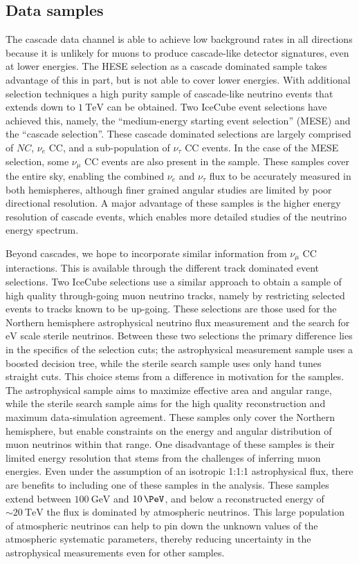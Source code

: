 \subsection{Data samples}
The cascade data channel is able to achieve low background rates in all directions because it is unlikely for muons to produce cascade-like detector signatures, even at lower energies.
The HESE selection as a cascade dominated sample takes advantage of this in part, but is not able to cover lower energies.
With additional selection techniques a high purity sample of cascade-like neutrino events that extends down to $\SI{1}\TeV$ can be obtained.
Two IceCube event selections have achieved this, namely, the ``medium-energy starting event selection'' (MESE) and the ``cascade selection''.
These cascade dominated selections are largely comprised of $NC$, $\nu_e$ CC, and a sub-population of $\nu_\tau$ CC events.
In the case of the MESE selection, some $\nu_\mu$ CC events are also present in the sample.
These samples cover the entire sky, enabling the combined $\nu_e$ and $\nu_\tau$ flux to be accurately measured in both hemispheres, although finer grained angular studies are limited by poor directional resolution.
A major advantage of these samples is the higher energy resolution of cascade events, which enables more detailed studies of the neutrino energy spectrum.

Beyond cascades, we hope to incorporate similar information from $\nu_\mu$ CC interactions.
This is available through the different track dominated event selections.
Two IceCube selections use a similar approach to obtain a sample of high quality through-going muon neutrino tracks, namely by restricting selected events to tracks known to be up-going.
These selections are those used for the Northern hemisphere astrophysical neutrino flux measurement and the search for $\si\eV$ scale sterile neutrinos.
Between these two selections the primary difference lies in the specifics of the selection cuts; the astrophysical measurement sample uses a boosted decision tree, while the sterile search sample uses only hand tunes straight cuts.
This choice stems from a difference in motivation for the samples.
The astrophysical sample aims to maximize effective area and angular range, while the sterile search sample aims for the high quality reconstruction and maximum data-simulation agreement.
These samples only cover the Northern hemisphere, but enable constraints on the energy and angular distribution of muon neutrinos within that range.
One disadvantage of these samples is their limited energy resolution that stems from the challenges of inferring muon energies.
Even under the assumption of an isotropic 1:1:1 astrophysical flux, there are benefits to including one of these samples in the analysis.
These samples extend between $\SI{100}\GeV$ and $\SI{10}\PeV$, and below a reconstructed energy of $\sim\SI{20}\TeV$ the flux is dominated by atmospheric neutrinos.
This large population of atmospheric neutrinos can help to pin down the unknown values of the atmospheric systematic parameters, thereby reducing uncertainty in the astrophysical measurements even for other samples.

